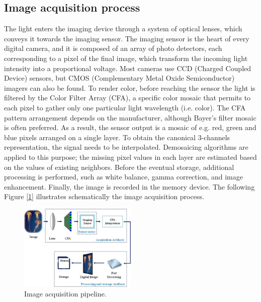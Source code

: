 \documentclass[a4paper, 12pt]{article}
\begin{document}
\subsection*{Image acquisition process}
The light enters the imaging device through a system of optical lenses, which conveys it towards the imaging sensor. The imaging sensor is the heart of every digital camera, and it is composed of an array of photo detectors, each corresponding to a pixel of the final image, which transform the incoming light intensity into a proportional voltage. Most cameras use CCD (Charged Coupled Device) sensors, but CMOS (Complementary Metal Oxide Semiconductor) imagers can also be found. To render color, before reaching the sensor the light is filtered
by the Color Filter Array (CFA), a specific color mosaic that permits to each pixel to gather
only one particular light wavelength (i.e. color). The CFA pattern arrangement depends on
the manufacturer, although Bayer’s filter mosaic is often preferred. As a result, the sensor
output is a mosaic of e.g. red, green and blue pixels arranged on a single layer. To obtain
the canonical 3-channels representation, the signal needs to be interpolated. Demosaicing
algorithms are applied to this purpose; the missing pixel values in each layer are estimated
based on the values of existing neighbors. Before the eventual storage, additional
processing is performed, such as white balance, gamma correction, and image enhancement.
Finally, the image is recorded in the memory device. The following Figure [\ref{fig:imacq}] illustrates schematically the image acquisition process.

\begin{figure}[H]
	\centering
	\includegraphics[width=0.5\textwidth]{imageacq}
	\caption{Image acquisition pipeline.}
	\label{fig:imacq}
\end{figure}
\end{document}
